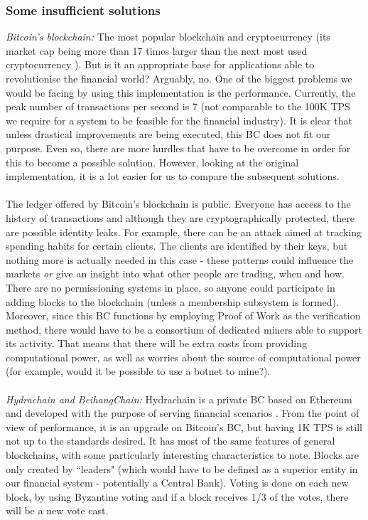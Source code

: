 \documentclass[12pt,twoside]{article}
\begin{document}
\subsubsection{Some insufficient solutions}
\label{sub:Insufficient}
\textit{Bitcoin's blockchain:} The most popular blockchain and cryptocurrency (its market cap being more than 17 times larger than the next most used cryptocurrency \cite{BC:MC}). But is it an appropriate base for applications able to revolutionise the financial world? Arguably, no. One of the biggest problems we would be facing by using this implementation is the performance. Currently, the peak number of transactions per second is 7 (not comparable to the 100K TPS we require for a system to be feasible for the financial industry). It is clear that unless drastical improvements are being executed, this BC does not fit our purpose. Even so, there are more hurdles that have to be overcome in order for this to become a possible solution. However, looking at the original implementation, it is a lot easier for us to compare the subsequent solutions. 
\\ \\
The ledger offered by Bitcoin's blockchain is public. Everyone has access to the history of transactions and although they are cryptographically protected, there are possible identity leaks. For example, there can be an attack aimed at tracking spending habits for certain clients. The clients are identified by their keys, but nothing more is actually needed in this case - these patterns could influence the markets \textit{or} give an insight into what other people are trading, when and how. There are no permissioning systems in place, so anyone could participate in adding blocks to the blockchain (unless a membership subsystem is formed). Moreover, since this BC functions by employing Proof of Work as the verification method, there would have to be a consortium of dedicated miners able to support its activity. That means that there will be extra costs from providing computational power, as well as worries about the source of computational power (for example, would it be possible to use a botnet to mine?).
\\ \\
\textit{Hydrachain and BeihangChain:} Hydrachain is a private BC based on Ethereum and developed with the purpose of serving financial scenarios \cite{Chinese}. From the point of view of performance, it is an upgrade on Bitcoin's BC, but having 1K TPS is still not up to the standards desired. It has most of the same features of general blockchains, with some particularly interesting characteristics to note. Blocks are only created by ``leaders" (which would have to be defined as a superior entity in our financial system - potentially a Central Bank). Voting is done on each new block, by using Byzantine voting and if a block receives 1/3 of the votes, there will be a new vote cast. 
\end{document}
